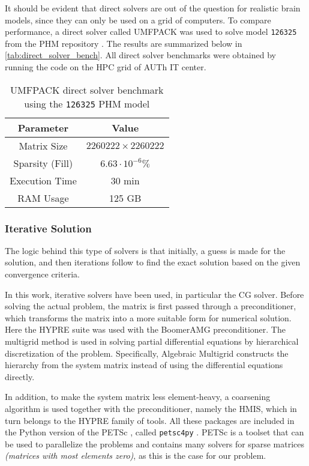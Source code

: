It should be evident that direct solvers are out of the question for realistic brain models, since they can only be used on a grid of computers. To compare performance, a direct solver called \gls{UMFPACK} \cite{Davis2004_umfpack} was used to solve model \texttt{126325} from the \gls{PHM} repository \cite{ErikG.Lee2016}. The results are summarized below in \autoref{tab:direct_solver_bench}. All direct solver benchmarks were obtained by running the code on the \gls{HPC} grid of \gls{AUTh} \gls{IT} center.

\begin{table}[!ht]
	\centering
	\caption{\gls{UMFPACK} direct solver benchmark using the \texttt{126325} \gls{PHM} model}
	\label{tab:direct_solver_bench}
	\begin{tabular}{|c|c|}
		\hline
		\rowcolor[HTML]{C0C0C0} 
		\textbf{Parameter} & \textbf{Value} \\ \hline
		Matrix Size & $2260222\times 2260222$ \\ \hline
		Sparsity (Fill) & $6.63\cdot 10^{-6}\%$ \\ \hline
		Execution Time & 30 min \\ \hline
		RAM Usage & 125 GB \\ \hline
	\end{tabular}
\end{table}

\subsubsection{Iterative Solution}
\label{subsec:iterative_solvers}

The logic behind this type of solvers is that initially, a guess is made for the solution, and then iterations follow to find the exact solution based on the given convergence criteria.

In this work, iterative solvers have been used, in particular the \gls{CG} solver. Before solving the actual problem, the matrix is first passed through a preconditioner, which transforms the matrix into a more suitable form for numerical solution. Here the \gls{HYPRE} \cite{hypre-web-page} suite was used with the Boomer\gls{AMG} \cite[chapter 4]{McCormick1987_amg} preconditioner. The multigrid method is used in solving partial differential equations by hierarchical discretization of the problem. Specifically, Algebraic Multigrid constructs the hierarchy from the system matrix instead of using the differential equations directly. 

In addition, to make the system matrix less element-heavy, a coarsening algorithm is used together with the preconditioner, namely the \gls{HMIS}, which in turn belongs to the \gls{HYPRE} family of tools. All these packages are included in the Python version of the \gls{PETSc} \cite{petsc-web-page,petsc-user-ref,petsc-efficient}, called \texttt{petsc4py} \cite{Dalcin2011}. \gls{PETSc} is a toolset that can be used to parallelize the problems and contains many solvers for sparse matrices \textit{(matrices with most elements zero)}, as this is the case for our problem.

